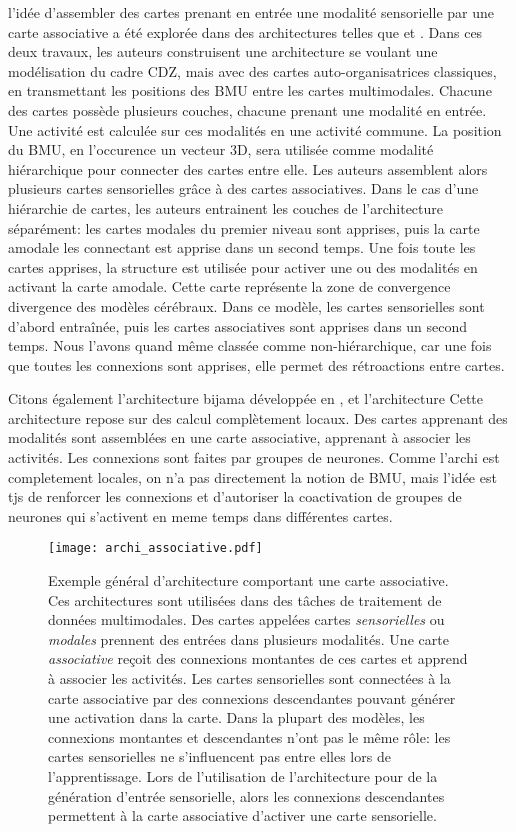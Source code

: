 \documentclass[../main]{subfiles}
\begin{document}
l'idée d'assembler des cartes prenant en entrée une modalité sensorielle par une carte associative a été explorée dans des architectures telles que \cite{dominey13} et \cite{escobar-juarez_self-organized_2016}.
Dans ces deux travaux, les auteurs construisent une architecture se voulant une modélisation du cadre CDZ, mais avec des cartes auto-organisatrices classiques, en transmettant les positions des BMU entre les cartes multimodales. 
Chacune des cartes possède plusieurs couches, chacune prenant une modalité en entrée. Une activité est calculée sur ces modalités en une activité commune. La position du BMU, en l'occurence un vecteur 3D, sera utilisée comme modalité hiérarchique pour connecter des cartes entre elle. Les auteurs assemblent alors plusieurs cartes sensorielles grâce à des cartes associatives.
Dans le cas d'une hiérarchie de cartes, les auteurs entrainent les couches de l'architecture séparément: les cartes modales du premier niveau sont apprises, puis la carte amodale les connectant est apprise dans un second temps. 
Une fois toute les cartes apprises, la structure est utilisée pour activer une ou des modalités en activant la carte amodale. Cette carte représente la zone de convergence divergence des modèles cérébraux. 
Dans ce modèle, les cartes sensorielles sont d'abord entraînée, puis les cartes associatives sont apprises dans un second temps. Nous l'avons quand même classée comme non-hiérarchique, car une fois que toutes les connexions sont apprises, elle permet des rétroactions entre cartes. 

Citons également l'architecture bijama développée en \cite{menard05,khouzam_2013}, et l'architecture \cite{lefort_active_2015}
Cette architecture repose sur des calcul complètement locaux. 
Des cartes apprenant des modalités sont assemblées en une carte associative, apprenant à associer les activités. Les connexions sont faites par groupes de neurones. Comme l'archi est completement locales, on n'a pas directement la notion de BMU, mais l'idée est tjs de renforcer les connexions et d'autoriser la coactivation de groupes de neurones qui s'activent en meme temps dans différentes cartes.

\begin{figure}
    \texttt{[image: archi\_associative.pdf]}
    \caption{Exemple général d'architecture comportant une carte associative. Ces architectures sont utilisées dans des tâches de traitement de données multimodales.
     Des cartes appelées cartes \emph{sensorielles} ou \emph{modales} prennent des entrées dans plusieurs modalités. Une carte \emph{associative} reçoit des connexions montantes de ces cartes et apprend à associer les activités. Les cartes sensorielles sont connectées à la carte associative par des connexions descendantes pouvant générer une activation dans la carte. Dans la plupart des modèles, les connexions montantes et descendantes n'ont pas le même rôle: les cartes sensorielles ne s'influencent pas entre elles lors de l'apprentissage.
     Lors de l'utilisation de l'architecture pour de la génération d'entrée sensorielle, alors les connexions descendantes permettent à la carte associative d'activer une carte sensorielle. \label{fig:archi_associative}
     }
\end{figure}
\end{document}
